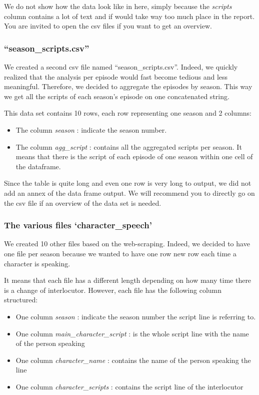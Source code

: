 \documentclass[
]{article}
\providecommand{\tightlist}{%
  \setlength{\itemsep}{0pt}\setlength{\parskip}{0pt}}
\begin{document}
We do not show how the data look like in here, simply because the
\emph{scripts} column contains a lot of text and if would take way too
much place in the report. You are invited to open the csv files if you
want to get an overview.

\hypertarget{season_scripts.csv}{%
\subsubsection{``season\_scripts.csv''}\label{season_scripts.csv}}

We created a second csv file named ``season\_scripts.csv''. Indeed, we
quickly realized that the analysis per episode would fast become tedious
and less meaningful. Therefore, we decided to aggregate the episodes by
season. This way we get all the scripts of each season's episode on one
concatenated string.

This data set contains 10 rows, each row representing one season and 2
columns:

\begin{itemize}
\tightlist
\item
  The column \emph{season} : indicate the season number.
\item
  The column \emph{agg\_script} : contains all the aggregated scripts
  per season. It means that there is the script of each episode of one
  season within one cell of the dataframe.
\end{itemize}

Since the table is quite long and even one row is very long to output,
we did not add an annex of the data frame output. We will recommend you
to directly go on the csv file if an overview of the data set is needed.

\hypertarget{the-various-files-character_speech}{%
\subsubsection{The various files
`character\_speech'}\label{the-various-files-character_speech}}

We created 10 other files based on the web-scraping. Indeed, we decided
to have one file per season because we wanted to have one row new row
each time a character is speaking.

It means that each file has a different length depending on how many
time there is a change of interlocutor. However, each file has the
following column structured:

\begin{itemize}
\tightlist
\item
  One column \emph{season} : indicate the season number the script line
  is referring to.
\item
  One column \emph{main\_character\_script} : is the whole script line
  with the name of the person speaking
\item
  One column \emph{character\_name} : contains the name of the person
  speaking the line
\item
  One column \emph{character\_scripts} : contains the script line of the
  interlocutor
\end{itemize}
\end{document}
